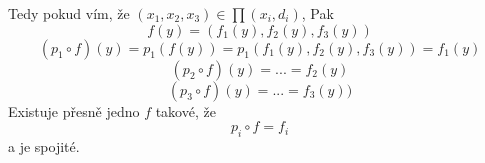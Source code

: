 \documentclass[../main.tex]{subfiles}
\begin{document}
Tedy pokud vím, že $(x_1,x_2,x_3)\in \prod (x_i,d_i)$, Pak
\[f(y) = (f_1(y),f_2(y),f_3(y))\]
\[(p_1\circ f)(y) = p_1(f(y)) = p_1(f_1(y),f_2(y),f_3(y))=f_1(y)\]
\[(p_2\circ f)(y) = ... = f_2(y)\]
\[(p_3\circ f)(y) = ... = f_3(y))\]
Existuje přesně jedno $f$ takové, že 
\[p_i \circ f = f_i\]
a je spojité.
\end{document}
